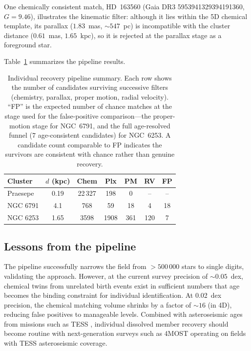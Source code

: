 \documentclass[fleqn,usenatbib]{mnras}
\begin{document}
One chemically consistent match, HD~163560 (Gaia DR3 5953941329394191360, $G = 9.46$), illustrates the kinematic filter: although it lies within the 5D chemical template, its parallax ($1.83$~mas, ${\sim}547$~pc) is incompatible with the cluster distance ($0.61$~mas, $1.65$~kpc), so it is rejected at the parallax stage as a foreground star.

Table~\ref{tab:pipeline} summarizes the pipeline results.

\begin{table}
\centering
\caption{Individual recovery pipeline summary. Each row shows the number of candidates surviving successive filters (chemistry, parallax, proper motion, radial velocity). ``FP'' is the expected number of chance matches at the stage used for the false-positive comparison---the proper-motion stage for NGC~6791, and the full age-resolved funnel ($7$ age-consistent candidates) for NGC~6253. A candidate count comparable to FP indicates the survivors are consistent with chance rather than genuine recovery.}
\label{tab:pipeline}
\begin{tabular}{lcccccc}
\toprule
Cluster & $d$ (kpc) & Chem & Plx & PM & RV & FP \\
\midrule
Praesepe   & 0.19 & 22\,327 & 198 & 0  & -- & -- \\
NGC 6791   & 4.1  & 768     & 59  & 18 & 4  & 18 \\
NGC 6253   & 1.65 & 3598    & 1908 & 361 & 120 & 7 \\
\bottomrule
\end{tabular}
\end{table}

\subsection{Lessons from the pipeline}

The pipeline successfully narrows the field from $> 500\,000$ stars to single digits, validating the approach.
However, at the current survey precision of ${\sim}0.05$~dex, chemical twins from unrelated birth events exist in sufficient numbers that age becomes the binding constraint for individual identification.
At 0.02~dex precision, the chemical matching volume shrinks by a factor of ${\sim}16$ (in 4D), reducing false positives to manageable levels.
Combined with asteroseismic ages from missions such as TESS \citep{Ricker2015, Hon2021}, individual dissolved member recovery should become routine with next-generation surveys such as 4MOST operating on fields with TESS asteroseismic coverage.
\end{document}
